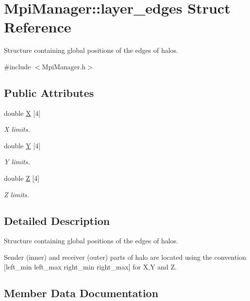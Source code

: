 \hypertarget{struct_mpi_manager_1_1layer__edges}{}\section{Mpi\+Manager\+:\+:layer\+\_\+edges Struct Reference}
\label{struct_mpi_manager_1_1layer__edges}


Structure containing global positions of the edges of halos.  




{\ttfamily \#include $<$Mpi\+Manager.\+h$>$}

\subsection*{Public Attributes}
\begin{DoxyCompactItemize}
\item 
double \hyperlink{struct_mpi_manager_1_1layer__edges_a9f79fa4b504f2d4418f2bc4747cc908c}{X} \mbox{[}4\mbox{]}
\begin{DoxyCompactList}\small\item\em X limits. \end{DoxyCompactList}\item 
double \hyperlink{struct_mpi_manager_1_1layer__edges_aa4d880e027a6410ff4b34e28dcd1f9d4}{Y} \mbox{[}4\mbox{]}
\begin{DoxyCompactList}\small\item\em Y limits. \end{DoxyCompactList}\item 
double \hyperlink{struct_mpi_manager_1_1layer__edges_a25eea1176a0c06c1e25a7a08b8840283}{Z} \mbox{[}4\mbox{]}
\begin{DoxyCompactList}\small\item\em Z limits. \end{DoxyCompactList}\end{DoxyCompactItemize}


\subsection{Detailed Description}
Structure containing global positions of the edges of halos. 

Sender (inner) and receiver (outer) parts of halo are located using the convention \mbox{[}left\+\_\+min left\+\_\+max right\+\_\+min right\+\_\+max\mbox{]} for X,Y and Z. 

\subsection{Member Data Documentation}

